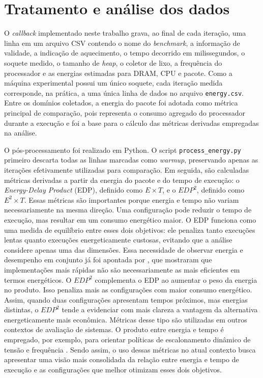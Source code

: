 \section{Tratamento e análise dos dados}

O \textit{callback} implementado neste trabalho grava, ao final de cada
iteração, uma linha em um arquivo CSV contendo o nome do \textit{benchmark}, a
informação de validade, a indicação de aquecimento, o tempo decorrido em
milissegundos, o soquete medido, o tamanho de \textit{heap}, o coletor de
lixo, a frequência do processador e as energias estimadas para DRAM, CPU e
pacote. Como a máquina experimental possui um único soquete, cada iteração
medida corresponde, na prática, a uma única linha de dados no arquivo
\texttt{energy.csv}. Entre os domínios coletados, a energia do pacote foi
adotada como métrica principal de comparação, pois representa o consumo
agregado do processador durante a execução e foi a base para o cálculo das
métricas derivadas empregadas na análise.

O pós-processamento foi realizado em Python. O script
\texttt{process\_energy.py} primeiro descarta todas as linhas marcadas como
\textit{warmup}, preservando apenas as iterações efetivamente utilizadas para
comparação. Em seguida, são calculadas métricas derivadas a partir da energia
do pacote e do tempo de execução: o \textit{Energy-Delay Product} (EDP),
definido como \(E \times T\), e o \(EDP^2\), definido como \(E^2 \times T\).
Essas métricas são importantes porque energia e tempo não variam
necessariamente na mesma direção. Uma configuração pode reduzir o tempo de
execução, mas resultar em um consumo energético maior. O EDP funciona como
uma medida de equilíbrio entre esses dois objetivos: ele penaliza tanto
execuções lentas quanto execuções energeticamente custosas, evitando que a
análise considere apenas uma das dimensões. Essa necessidade de observar
energia e desempenho em conjunto já foi apontada por
, que mostraram que implementações mais
rápidas não são necessariamente as mais eficientes em termos energéticos.
O \(EDP^2\) complementa o EDP ao aumentar o peso da
energia no produto. Isso penaliza mais as configurações com maior consumo 
energético. Assim, quando duas configurações apresentam tempos próximos, 
mas energias distintas, o \(EDP^2\) tende a evidenciar com mais clareza 
a vantagem da alternativa energeticamente mais econômica. Métricas 
desse tipo são utilizadas em outros contextos de avaliação de 
sistemas. O produto entre energia e tempo é empregado, por exemplo, 
para orientar políticas de escalonamento dinâmico de
tensão e frequência \cite{green-governors}. Sendo assim, 
o uso dessas métricas no atual contexto busca apresentar uma visão mais consolidada 
da relação entre energia e tempo de execução e as configurações que melhor 
otimizam esses dois objetivos.

